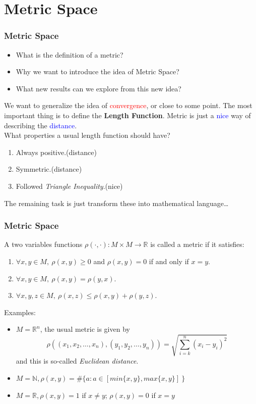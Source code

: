 \documentclass{beamer}
\begin{document}
\section{Metric Space}
\begin{frame}
    \frametitle{Metric Space}
    \begin{itemize}
        \item What is the definition of a metric?
        \item Why we want to introduce the idea of Metric Space?
        \item What new results can we explore from this new idea?
    \end{itemize}
    We want to generalize the idea of \textcolor{red}{convergence}, or close to some point.
    The most important thing is to define
    the \textbf{Length Function}. Metric is just a \textcolor{blue}{nice} way of describing the
    \textcolor{blue}{distance}.\\

    \vspace{1em}
    What properties a usual length function should have?
    \begin{enumerate}
        \item Always positive.(distance)
        \item Symmetric.(distance)
        \item Followed \emph{Triangle Inequality}.(nice)
    \end{enumerate}
    \vspace{0.5em}
    The remaining task is just
    transform these into mathematical language\dots
\end{frame}
\begin{frame}
    \frametitle{Metric Space}
    A two variables functions
    $\rho(\cdot,\cdot):M\times M \rightarrow \mathbb{R}$
    is called a metric if it satisfies:
    \begin{enumerate}
        \item $\forall x,y\in M,\ \rho (x,y) \geq 0$ and $\rho (x,y)=0$ if and only if $x=y$.
        \item  $\forall x,y\in M,\ \rho (x,y)=\rho (y,x)$.
        \item  $\forall x,y,z\in M,\ \rho (x,z)\leq \rho (x,y)+\rho (y,z)$.
    \end{enumerate}

    Examples:
    \begin{itemize}
        \item $M=\mathbb{R}^n$, the usual metric is given by
              \begin{equation*}
                  \rho ( (x_1,x_2,\dots,x_n), (y_1,y_2,\dots,y_n)) = \sqrt{\sum^{n}_{i=k}(x_i-y_i)^2 }
              \end{equation*}
              and this is so-called \emph{Euclidean distance}.
        \item $M=\mathbb{N}, \rho(x,y)= \#\{ a:a\in [min\{x,y\},max\{x,y\}]\ \} $
        \item $M=\mathbb{R},\rho (x,y)=1 $ if $x\neq y$; $\rho (x,y)=0$ if $x=y$
    \end{itemize}
\end{frame}
\end{document}
